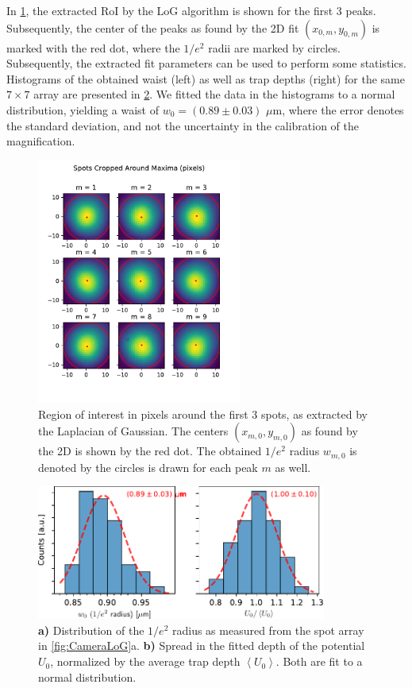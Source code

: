 In \cref{fig:SpotsRoI}, the extracted \ac{RoI} by the \ac{LoG} algorithm is shown for the first 3 peaks. 
Subsequently, the center of the peaks as found by the 2D fit $(x_{0,m},y_{0,m})$ is marked with the red dot, where the $1/e^2$ radii are marked by circles. 
Subsequently, the extracted fit parameters can be used to perform some statistics.
Histograms of the obtained waist (left) as well as trap depths (right) for the same $7\times7$ array are presented in \cref{fig:Histograms}.
We fitted the data in the histograms to a normal distribution, yielding a waist of $w_0 = (0.89 \pm 0.03)$ $\mu$m, where the error denotes the standard deviation, and not the uncertainty in the calibration of the magnification. 

\begin{figure}
    \centering
    \includegraphics[width=0.6\textwidth]{figures/SpotsCropped_range12.pdf}
    \caption{Region of interest in pixels around the first 3 spots, as extracted by the Laplacian of Gaussian. 
    The centers $(x_{m,0},y_{m,0})$ as found by the 2D is shown by the red dot. 
    The obtained $1/e^2$ radius $w_{m,0}$ is denoted by the circles is drawn for each peak $m$ as well.}
    \label{fig:SpotsRoI}
\end{figure}



\begin{figure}
    \centering
    \includegraphics[width=0.85\textwidth]{figures/FittedHistograms.pdf}
    \caption{\textbf{a)} Distribution of the $1/e^2$ radius as measured from the spot array in \cref{fig:CameraLoG}a.
    \textbf{b)} Spread in the fitted depth of the potential $U_0$, normalized by the average trap depth $\left\langle U_0 \right\rangle$.
    Both are fit to a normal distribution.
    }
    \label{fig:Histograms}
\end{figure}

